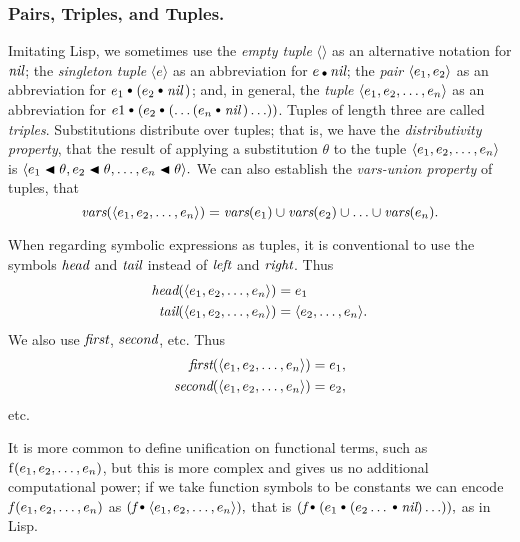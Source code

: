 \documentclass[runningheads]{llncs}
\DeclareMathOperator{\lef}{\emph{left}}
\DeclareMathOperator{\rig}{\emph{right}}
\DeclareMathOperator{\ufirst}{\emph{first}}
\DeclareMathOperator{\usecond}{\emph{second}}
\begin{document}
\subsubsection{Pairs, Triples, and Tuples.} Imitating Lisp, we sometimes use the \emph{empty tuple}  $\langle \rangle$ as an alternative notation for $\emph{nil}$; the \emph{singleton tuple} $\langle e  \rangle$ as an abbreviation for $\e \cons \nil$; the \emph{pair} $\langle e_{1}, e_{2} \rangle$ as an abbreviation for $\e{1} \cons (\e{2} \cons \nil\,)$; and, in general, the \emph{tuple} $\langle e_{1}, e_{2}, \ldots, e_{n} \rangle$ as an abbreviation for $e{1} \cons (\e{2} \cons (\ldots (\e{n} \cons \nil\,)\ldots))$. Tuples of length three are called \emph{triples}. Substitutions distribute over tuples; that is, we have the \emph{distributivity property}, that the result of applying a substitution $\theta$ to the tuple $\langle e_{1}, e_{2}, \ldots, e_{n} \rangle$ is  $\langle e_{1} \blacktriangleleft \theta, e_{2}\blacktriangleleft \theta, \ldots, e_{n}\blacktriangleleft \theta \rangle.$ We can also establish the \emph{vars-union property} of tuples, that 
\[\emph{vars}(\langle e_{1}, e_{2}, \ldots, e_{n} \rangle)
= \emph{vars}(e_{1}) \cup \emph{vars}(e_{2}) \cup \ldots \cup \emph{vars}(e_{n}).
\]

When regarding symbolic expressions as tuples, it is conventional to use the symbols $\emph{head}$ and $\emph{tail}$ instead of $\lef$ and $\rig$.  Thus
\[
\begin{split}
\emph{head}(\langle e_{1}, e_{2}, \ldots, e_{n} \rangle) &= e_{1}\\  \emph{tail}(\langle e_{1}, e_{2}, \ldots, e_{n} \rangle) &= \langle e_{2}, \ldots, e_{n} \rangle.
\end{split}\]
We also use $\ufirst$, $\usecond$, etc.  Thus
\[\begin{split}
\ufirst(\langle \e{1}, \e{2}, \ldots, \e{n} \rangle) &= \e{1},  \\ \usecond(\langle \e{1}, \e{2}, \ldots, \e{n} \rangle) &=  \e{2},
\end{split}
\]
etc.

 It is more common to define unification on functional terms, such as $\operatorname{f}(e_{1},e_{2},\allowbreak \ldots, e_{n})$, but this is more complex and gives us no additional computational power; if we take function symbols to be constants we can encode $\emph{f}\,(e_{1},e_{2}, \ldots, e_{n})$ as 
          $(\emph{f} \cons \langle \e{1}, \e{2}, \ldots, \e{n} \rangle),$ that is 
                    $(\emph{f} \cons (\e{1} \cons (\e{2} \ldots \cons \nil)\ldots )),$
          as in Lisp.
   
\end{document}
